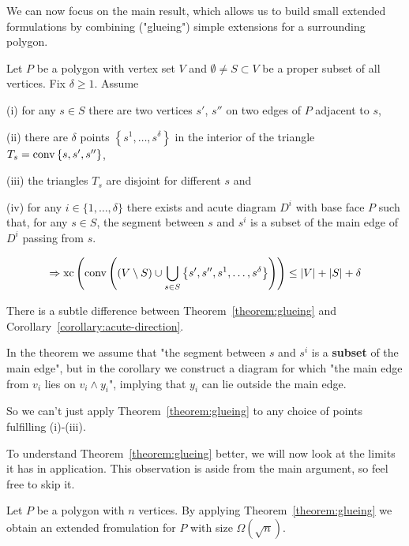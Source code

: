 We can now focus on the main result, which allows us to build small extended formulations by combining ("glueing") simple extensions for a surrounding polygon.

\begin{theorem}\label{theorem:glueing}
  Let $P$ be a polygon with vertex set $V$ and $\emptyset \neq S \subset V$ be a proper subset of all vertices. Fix $\delta \geq 1$. Assume

  (i) for any $s \in S$ there are two vertices $s'$, $s''$ on two edges of $P$ adjacent to $s$,

  (ii) there are $\delta$ points $\left\{s^1, \dots, s^\delta \right\}$ in the interior of the triangle ${T_s = \operatorname{conv} \left\{s,s',s''\right\}}$,
  
  (iii) the triangles $T_s$ are disjoint for different $s$ and

  (iv) for any $i \in \{1,\dots,\delta\}$ there exists and acute diagram $D^i$ with base face $P$ such that, for any $s \in S$, the segment between $s$ and $s^i$ is a subset of the main edge of $D^i$ passing from $s$. 
  
  $$\Rightarrow \operatorname{xc}\left( \operatorname{conv}\left( (V \setminus S) \cup \bigcup_{s \in S} \left\{ s',s'',s^1,\dots,s^\delta \right\}  \right) \right) \leq \lvert V\rvert + \lvert S\rvert + \delta$$
\end{theorem}

\begin{remark}
  There is a subtle difference between Theorem~\ref{theorem:glueing} and Corollary~\ref{corollary:acute-direction}.

  In the theorem we assume that "the segment between $s$ and $s^i$ is a \textbf{subset} of the main edge", but in the corollary we construct a diagram for which "the main edge from $v_i$ lies on $v_i \wedge y_i$", implying that $y_i$ can lie outside the main edge. 

  So we can't just apply Theorem~\ref{theorem:glueing} to any choice of points fulfilling (i)-(iii).
\end{remark}

To understand Theorem~\ref{theorem:glueing} better, we will now look at the limits it has in application. This observation is aside from the main argument, so feel free to skip it.

\begin{observation}
  Let $P$ be a polygon with $n$ vertices. By applying Theorem~\ref{theorem:glueing} we obtain an extended fromulation for $P$ with size $\Omega(\sqrt{n})$.
\end{observation}

